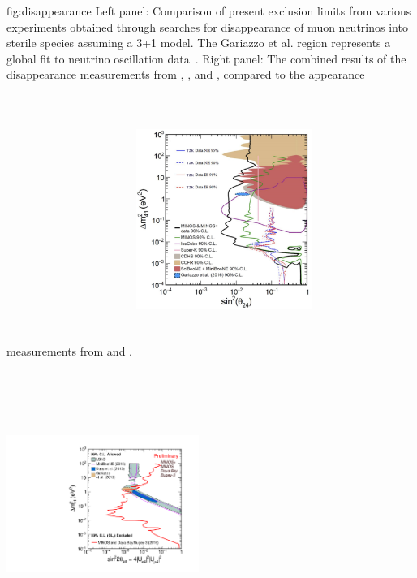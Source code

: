 \begin{dunefigure}{fig:disappearance}
{Left panel: Comparison of present exclusion limits from various experiments obtained through searches for disappearance of muon neutrinos into sterile species assuming a 3+1 model.  The Gariazzo et al. region represents a global fit to neutrino oscillation data~\cite{Gariazzo:2015rra}. 
    Right panel: The combined results of the disappearance measurements from , , and , compared to the appearance measurements from  and \miniboone.}
    \includegraphics[height=3.5in,width=0.43\textwidth]{graphics/disappearance}
    \includegraphics[height=3.7in,width=0.47\textwidth]{graphics/ComboLimit99_prelim.pdf}
\end{dunefigure}


